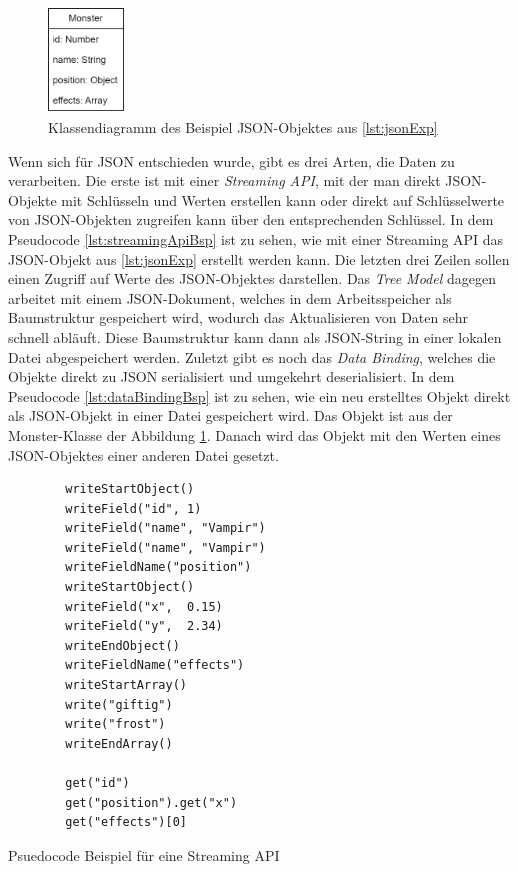 \begin{figure}[htp]
    \centering
    \includegraphics[width=0.18\textwidth]{images/MonsterBspKlasse.png}
    \caption{Klassendiagramm des Beispiel JSON-Objektes aus \ref{lst:jsonExp}}
    \label{fig:monsterBspKlasse}
\end{figure}

Wenn sich für JSON entschieden wurde, gibt es drei Arten, die Daten zu verarbeiten. Die erste ist mit einer \textit{Streaming API}, mit der man direkt JSON-Objekte mit Schlüsseln und Werten erstellen kann oder direkt auf Schlüsselwerte von JSON-Objekten zugreifen kann über den  entsprechenden Schlüssel. In dem Pseudocode \ref{lst:streamingApiBsp} ist zu sehen, wie mit einer Streaming API das JSON-Objekt aus \ref{lst:jsonExp} erstellt werden kann. Die letzten drei Zeilen sollen einen Zugriff auf Werte des JSON-Objektes darstellen.\cite{tutorialspointJacksonStreaming} Das \textit{Tree Model} dagegen arbeitet mit einem JSON-Dokument, welches in dem Arbeitsspeicher als Baumstruktur gespeichert wird, wodurch das Aktualisieren von Daten sehr schnell abläuft. Diese Baumstruktur kann dann als JSON-String in einer lokalen Datei abgespeichert werden. Zuletzt gibt es noch das \textit{Data Binding}, welches die Objekte direkt zu JSON serialisiert und umgekehrt deserialisiert. In dem Pseudocode \ref{lst:dataBindingBsp} ist zu sehen, wie ein neu erstelltes Objekt direkt als JSON-Objekt in einer Datei gespeichert wird. Das Objekt ist aus der Monster-Klasse der Abbildung \ref{fig:monsterBspKlasse}. Danach wird das Objekt mit den Werten eines JSON-Objektes einer anderen Datei gesetzt.\cite{tutorialspointJacksonData}\cite{tutorialspointJacksonOverview}

\begin{listing}[htp]
    \begin{verbatim} 
        writeStartObject()
        writeField("id", 1)
        writeField("name", "Vampir")
        writeField("name", "Vampir")
        writeFieldName("position")
        writeStartObject()
        writeField("x",  0.15) 
        writeField("y",  2.34) 
        writeEndObject()
        writeFieldName("effects")
        writeStartArray()
        write("giftig") 
        write("frost")
        writeEndArray()

        get("id")
        get("position").get("x")
        get("effects")[0]
    \end{verbatim}
    \caption{Psuedocode Beispiel für eine Streaming API}
    \label{lst:streamingApiBsp}
\end{listing}

